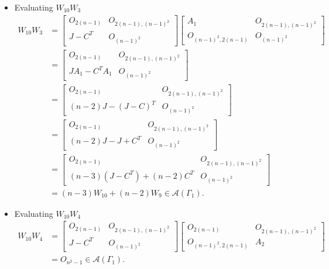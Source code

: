 \begin{itemize}
    \item Evaluating $W_{10}W_3$
    \begin{align*}
        W_{10}W_3
        &=\begin{bmatrix}
            O_{2(n-1)} & O_{2(n-1), (n-1)^2} \\
            J-C^T & O_{(n-1)^2}
        \end{bmatrix}\begin{bmatrix}
            A_1 & O_{2(n-1), (n-1)^2} \\
            O_{(n-1)^2, 2(n-1)} & O_{(n-1)^2}
        \end{bmatrix}\\
        &= \begin{bmatrix}
            O_{2(n-1)} & O_{2(n-1), (n-1)^2} \\
            JA_1-C^TA_1 & O_{(n-1)^2}
        \end{bmatrix}\\
        &= \begin{bmatrix}
            O_{2(n-1)} & O_{2(n-1), (n-1)^2} \\
            (n-2)J-(J-C)^T & O_{(n-1)^2}
        \end{bmatrix}\\
        &= \begin{bmatrix}
            O_{2(n-1)} & O_{2(n-1), (n-1)^2} \\
            (n-2)J-J+C^T & O_{(n-1)^2}
        \end{bmatrix}\\
        &= \begin{bmatrix}
            O_{2(n-1)} & O_{2(n-1), (n-1)^2} \\
            (n-3)(J-C^T) + (n-2)C^T & O_{(n-1)^2}
        \end{bmatrix}\\
        &= (n-3)W_{10} + (n-2)W_9\in\mathcal{A}(\Gamma_1).
    \end{align*}
    
    \item Evaluating $W_{10}W_4$
    \begin{align*}
        W_{10}W_4
        &=\begin{bmatrix}
            O_{2(n-1)} & O_{2(n-1), (n-1)^2} \\
            J-C^T & O_{(n-1)^2}
        \end{bmatrix}\begin{bmatrix}
            O_{2(n-1)} & O_{2(n-1), (n-1)^2} \\
            O_{(n-1)^2, 2(n-1)} & A_2
        \end{bmatrix}\\
        &= O_{n^2-1}\in\mathcal{A}(\Gamma_1).
    \end{align*}
    

\end{itemize}
